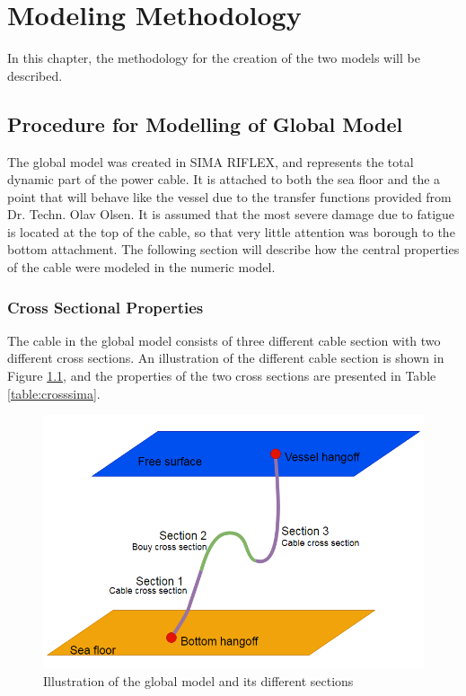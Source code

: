 \chapter{Modeling Methodology}
\label{chap:procedure}
In this chapter, the methodology for the creation of the two models will be described.
\section{Procedure for Modelling of Global Model}
\label{sec:globmod}
The global model was created in SIMA RIFLEX, and represents the total dynamic part of the power cable. It is attached to both the sea floor and the a point that will behave like the vessel due to the transfer functions provided from Dr. Techn. Olav Olsen. It is assumed that the most severe damage due to fatigue is located at the top of the cable, so that very little attention was borough to the bottom attachment. The following section will describe how the central properties of the cable were modeled in the numeric model. 

\subsection{Cross Sectional Properties}
The cable in the global model consists of three different cable section with two different cross sections. An illustration of the different cable section is shown in Figure \ref{fig:globalill}, and the properties of the two cross sections are presented in Table \ref{table:crosssima}. 

\begin{figure}[H]
\centering
\includegraphics[scale=0.6]{figures/globalill}
\caption [$\; \:$ Illustration of the global model and its different sections ]{Illustration of the global model and its different sections}
 \label{fig:globalill}
\end{figure}

